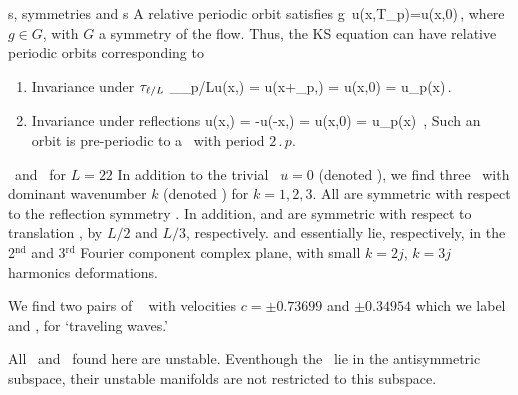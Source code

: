 \documentclass{theo1poster}[2003/04/25]
\begin{document}
\begin{poster}{3}
\begin{sheet}{\Rpo s, symmetries and \po s}
A relative periodic orbit satisfies
\beq
	g\, u(x,T_p)=u(x,0)\,,
\eeq
where $g\in G$, with $G$ a symmetry of the flow.
Thus, the KS equation can have relative periodic orbits corresponding
to 
\begin{enumerate}
 \item Invariance under $\tau_{\ell/L}$
	\beq
		\Shift_{\shift_p/L}u(x,) =
			u(x+\shift_p,) = u(x,0) = u_p(x)\,.
		\label{KSrpos}
	\eeq
 \item Invariance under reflections 
	\beq
		\Refl u(x,) =
			-u(-x,) = u(x,0) = u_p(x)
			\,,
		\label{KSpos}
	\eeq
	Such an orbit is pre-periodic to a \po\ with period $2\period{p}$.
\end{enumerate}

\end{sheet}


\begin{sheet}{\Eqva\ and \reqva\ for $L=22$}
In addition to the trivial \eqv\ $u=0$ (denoted ),
we find three \eqva\ with dominant wavenumber $k$
(denoted ) for $k = 1, 2, 3$.  All {\eqva}  are symmetric with respect to the reflection
symmetry .
In addition,  and  are symmetric with respect
to translation , by $L/2$ and $L/3$, respectively.
 and  essentially lie, respectively, in
the 2$^\mathrm{nd}$ and 3$^\mathrm{rd}$ Fourier component complex plane,
with small $k=2j$, $k=3j$ harmonics deformations.

We find two pairs of \reqva\  with velocities
$c =\pm 0.73699$ and $\pm 0.34954$
which we label  and ,
for `traveling waves.' 

All \eqva\ and \reqva\ found here are unstable. Eventhough the \eqva\ lie in
the antisymmetric subspace, their unstable manifolds are not restricted to this subspace.


\end{sheet}
\end{poster}
\end{document}
